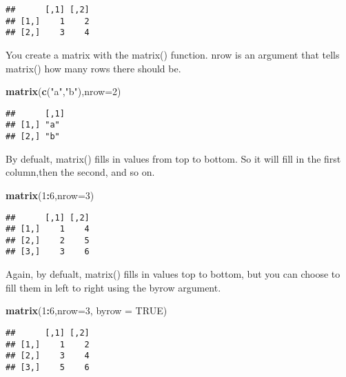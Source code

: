 \documentclass[
]{article}
\newenvironment{Shaded}{\begin{snugshade}}{\end{snugshade}}
\newcommand{\DataTypeTok}[1]{\textcolor[rgb]{0.13,0.29,0.53}{#1}}
\newcommand{\DecValTok}[1]{\textcolor[rgb]{0.00,0.00,0.81}{#1}}
\newcommand{\KeywordTok}[1]{\textcolor[rgb]{0.13,0.29,0.53}{\textbf{#1}}}
\newcommand{\NormalTok}[1]{#1}
\newcommand{\OperatorTok}[1]{\textcolor[rgb]{0.81,0.36,0.00}{\textbf{#1}}}
\newcommand{\OtherTok}[1]{\textcolor[rgb]{0.56,0.35,0.01}{#1}}
\newcommand{\StringTok}[1]{\textcolor[rgb]{0.31,0.60,0.02}{#1}}
\begin{document}
\begin{verbatim}
##      [,1] [,2]
## [1,]    1    2
## [2,]    3    4
\end{verbatim}

You create a matrix with the matrix() function. nrow is an argument that
tells matrix() how many rows there should be.

\begin{Shaded}
\begin{Highlighting}[]
\KeywordTok{matrix}\NormalTok{(}\KeywordTok{c}\NormalTok{(}\StringTok{"a"}\NormalTok{,}\StringTok{"b"}\NormalTok{),}\DataTypeTok{nrow=}\DecValTok{2}\NormalTok{)}
\end{Highlighting}
\end{Shaded}

\begin{verbatim}
##      [,1]
## [1,] "a" 
## [2,] "b"
\end{verbatim}

By defualt, matrix() fills in values from top to bottom. So it will fill
in the first column,then the second, and so on.

\begin{Shaded}
\begin{Highlighting}[]
\KeywordTok{matrix}\NormalTok{(}\DecValTok{1}\OperatorTok{:}\DecValTok{6}\NormalTok{,}\DataTypeTok{nrow=}\DecValTok{3}\NormalTok{)}
\end{Highlighting}
\end{Shaded}

\begin{verbatim}
##      [,1] [,2]
## [1,]    1    4
## [2,]    2    5
## [3,]    3    6
\end{verbatim}

Again, by defualt, matrix() fills in values top to bottom, but you can
choose to fill them in left to right using the byrow argument.

\begin{Shaded}
\begin{Highlighting}[]
\KeywordTok{matrix}\NormalTok{(}\DecValTok{1}\OperatorTok{:}\DecValTok{6}\NormalTok{,}\DataTypeTok{nrow=}\DecValTok{3}\NormalTok{, }\DataTypeTok{byrow =} \OtherTok{TRUE}\NormalTok{)}
\end{Highlighting}
\end{Shaded}

\begin{verbatim}
##      [,1] [,2]
## [1,]    1    2
## [2,]    3    4
## [3,]    5    6
\end{verbatim}
\end{document}
